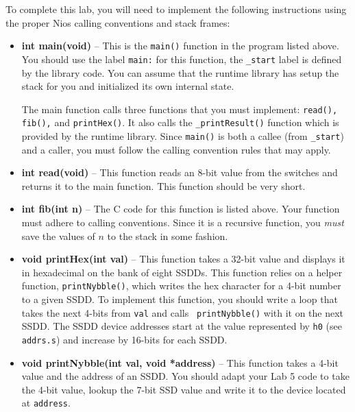 \documentclass[10pt]{article}
\begin{document}
To complete this lab, you will need to implement the following instructions
using the proper Nios calling conventions and stack frames:

\begin{itemize}
  \item {\bf int main(void)} -- This is the {\tt main()} function in the
    program listed above. You should use the label {\tt main:} for this
    function, the {\tt \_start} label is defined by the library code. You can
    assume that the runtime library has setup the stack for you and initialized
    its own internal state.

    The main function calls three functions that you must implement: {\tt read(),
      fib(),} and {\tt printHex()}. It also calls the {\tt \_printResult()}
    function which is provided by the runtime library. Since {\tt main()} is
    both a callee (from {\tt \_start}) and a caller, you must follow the calling
    convention rules that may apply.

  \item {\bf int read(void)} -- This function reads an 8-bit value from the switches
    and returns it to the main function. This function should be very short.

  \item {\bf int fib(int n)} -- The C code for this function is listed above.
    Your function must adhere to calling conventions. Since it is a recursive
    function, you {\em must} save the values of $n$ to the stack in some fashion.

  \item {\bf void printHex(int val)} -- This function takes a 32-bit value and
    displays it in hexadecimal on the bank of eight SSDDs. This function relies
    on a helper function, {\tt printNybble()}, which writes the hex character
    for a 4-bit number to a given SSDD. To implement this function, you should
    write a loop that takes the next 4-bits from {\tt val} and calls {\tt
      printNybble()} with it on the next SSDD. The SSDD device addresses start
    at the value represented by {\tt h0} (see {\tt addrs.s}) and increase by
    16-bits for each SSDD.

  \item {\bf void printNybble(int val, void *address)}  -- This function
    takes a 4-bit value and the address of an SSDD. You should adapt your
    Lab 5 code to take the 4-bit value, lookup the 7-bit SSD value and
    write it to the device located at {\tt address}.
\end{itemize}
\end{document}

